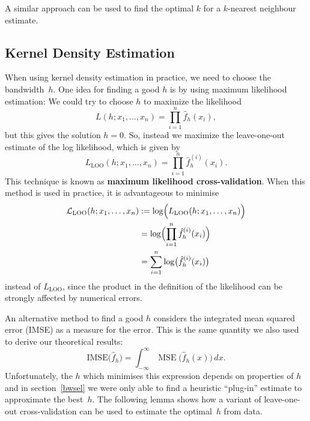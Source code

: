 \documentclass[
  a4paper,
]{article}
\theoremstyle{definition}
\theoremstyle{definition}
\theoremstyle{definition}
\theoremstyle{definition}
\theoremstyle{remark}
\begin{document}
A similar approach can be used to find the optimal \(k\) for
a \(k\)-nearest neighbour estimate.

\hypertarget{kernel-density-estimation-1}{%
\subsection{Kernel Density Estimation}\label{kernel-density-estimation-1}}

When using kernel density estimation in practice, we need to choose the
bandwidth~\(h\). One idea for finding a good \(h\) is by using
maximum likelihood estimation: We could try to
choose \(h\) to maximize the likelihood
\begin{equation*}
  L(h;x_1, \ldots, x_n)
  = \prod_{i=1}^n \hat f_h(x_i),
\end{equation*}
but this gives the solution \(h=0\). So, instead we maximize the
leave-one-out estimate of the log likelihood, which is given by
\begin{equation*}
  L_\mathrm{LOO}(h;x_1, \ldots, x_n)
  = \prod_{i=1}^n \hat f^{(i)}_h(x_i).
\end{equation*}
This technique is known as \textbf{maximum likelihood cross-validation}.
When this method is used in practice, it is advantageous to minimise
\begin{align*}
  \mathcal{L}_\mathrm{LOO}(h;x_1, \ldots, x_n)
  &:= \log\Bigl( L_\mathrm{LOO}(h;x_1, \ldots, x_n) \Bigr) \\
  &= \log\Bigl( \prod_{i=1}^n \hat f^{(i)}_h(x_i) \Bigr) \\
  &= \sum_{i=1}^n \log\bigl( \hat f^{(i)}_h(x_i) \bigr)
\end{align*}
instead of \(L_\mathrm{LOO}\), since the product in the definition
of the likelihood can be strongly affected by numerical errors.

An alternative method to find a good \(h\) considers the
integrated mean squared error (IMSE) as a measure for the error.
This is the same quantity we also used to derive our theoretical results:
\begin{equation*}
  \mathrm{IMSE}\bigl( \hat f_h \bigr)
  = \int_{-\infty}^\infty \mathop{\mathrm{MSE}}\nolimits\bigl( \hat f_h(x) \bigr) \,dx.
\end{equation*}
Unfortunately, the \(h\) which minimises this expression depends
on properties of \(h\) and in section~\ref{bwsel} we were only
able to find a heuristic ``plug-in'' estimate to approximate the best~\(h\).
The following lemma shows how a variant of leave-one-out cross-validation
can be used to estimate the optimal~\(h\) from data.
\end{document}
